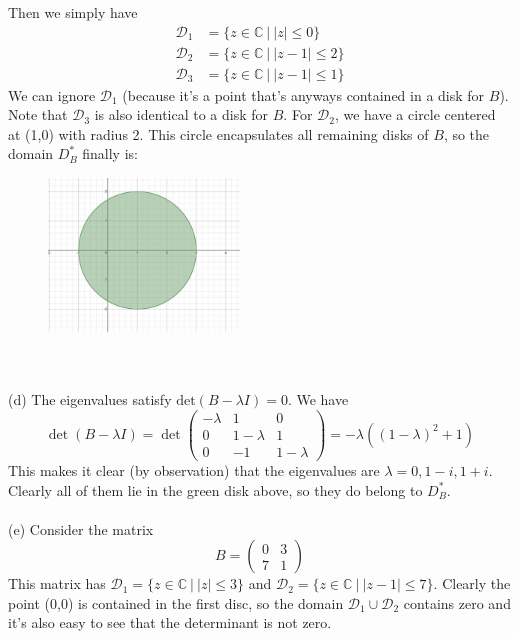 \documentclass{article}
\begin{document}
Then we simply have
\begin{align*}
    \mathcal{D}_{1} &= \{z \in \mathbb{C} \ | \ |z| \leq 0 \}\\
    \mathcal{D}_{2} &= \{z \in \mathbb{C} \ | \ |z - 1| \leq 2 \} \\
    \mathcal{D}_{3} &= \{z \in \mathbb{C} \ | \ |z - 1| \leq 1\}
\end{align*}
We can ignore $\mathcal{D}_{1}$ (because it's a point that's anyways contained in a disk for $B$). Note that $\mathcal{D}_{3}$ is also identical to a disk for $B$. For $\mathcal{D}_{2}$, we have a circle centered at (1,0) with radius 2. This circle encapsulates all remaining disks of $B$, so the domain $D_{B}^{*}$ finally is:
\begin{figure}[htp]
    \centering
    \includegraphics[width=2in]{img2.png}
    \label{fig:galaxy}
\end{figure}\\\\
(d) The eigenvalues satisfy $\text{det}(B - \lambda I) = 0$. We have
\begin{equation*}
    \det (B - \lambda I) = \det \begin{pmatrix}
        -\lambda & 1 & 0\\
        0 & 1 - \lambda & 1\\
        0 & -1  & 1 - \lambda
    \end{pmatrix} = -\lambda ((1-\lambda)^2 + 1)
\end{equation*}
This makes it clear (by observation) that the eigenvalues are $\lambda = 0, 1 - i, 1 + i$. Clearly all of them lie in the green disk above, so they do belong to $D_{B}^{*}$. \\\\
(e) Consider the matrix 
\begin{equation*}
    B = \begin{pmatrix}
        0 & 3\\
        7 & 1
    \end{pmatrix}
\end{equation*}
This matrix has $\mathcal{D}_{1} = \{z \in \mathbb{C} \ | \ |z| \leq 3\}$ and $\mathcal{D}_{2} = \{z \in \mathbb{C} \ | \ |z-1| \leq 7\}$. Clearly the point (0,0) is contained in the first disc, so the domain $\mathcal{D}_{1}\cup \mathcal{D}_{2}$ contains zero and it's also easy to see that the determinant is not zero. 

\end{document}
